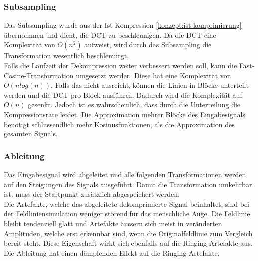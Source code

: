 \subsubsection{Subsampling} \label{konzept:loesung1:subsampling}
Das Subsampling wurde aus der Ist-Kompression \ref{konzept:ist-komprimierung} übernommen und dient, die DCT zu beschleunigen. Da die DCT eine Komplexität von $O(n^2)$ aufweist, wird durch das Subsampling die Transformation wesentlich beschlenuitgt.\\
Falls die Laufzeit der Dekompression weiter verbessert werden soll, kann die Fast-Cosine-Transformation umgesetzt werden. Diese hat eine Komplexität von $O(n log(n))$. Falls das nicht ausreicht, können die Linien in Blöcke unterteilt werden und die DCT pro Block ausführen. Dadurch wird die Komplexität auf $O(n)$ gesenkt. Jedoch ist es wahrscheinlich, dass durch die Unterteilung die Kompressionsrate leidet. Die Approximation mehrer Blöcke des Eingabesignals benötigt schlussendlich mehr Kosinusfunktionen, als die Approximation des gesamten Signals.

\subsubsection{Ableitung}
Das Eingabesignal wird abgeleitet und alle folgenden Transformationen werden auf den Steigungen des Signals ausgeführt. Damit die Transformation umkehrbar ist, muss der Startpunkt zusätzlich abgespeichert werden.\\
Die Artefakte, welche das abgeleitete dekomprimierte Signal beinhaltet, sind bei der Feldliniensimulation weniger störend für das menschliche Auge. Die Feldlinie bleibt tendenziell glatt und Artefakte äussern sich meist in veränderten Amplituden, welche erst erkennbar sind, wenn die Originalfeldlinie zum Vergleich bereit steht. Diese Eigenschaft wirkt sich ebenfalls auf die Ringing-Artefakte aus. Die Ableitung hat einen dämpfenden Effekt auf die Ringing Artefakte.

